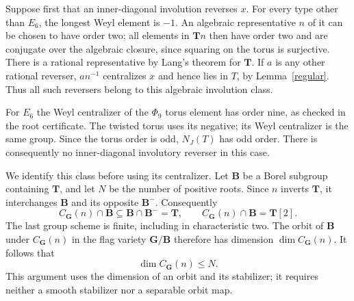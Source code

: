 \documentclass[10pt,a4paper]{article}
\begin{document}
Suppose first that an inner-diagonal involution reverses $x$.
For every type other than $E_6$, the longest Weyl element is $-1$.
An algebraic representative $n$ of it can be chosen to have order two;
all elements in $\mathbf Tn$ then have order two and are conjugate
over the algebraic closure, since squaring on the torus is surjective.
There is a rational representative by Lang's theorem for $\mathbf T$.
If $a$ is any other rational reverser, $an^{-1}$ centralizes $x$ and hence
lies in $T$, by Lemma~\ref{regular}. Thus all such reversers belong to
this algebraic involution class.

For $E_6$ the Weyl centralizer of the $\Phi_9$ torus element has order
nine, as checked in the root certificate. The twisted torus uses its
negative; its Weyl centralizer is the same group. Since the torus order
is odd, $N_J(T)$ has odd order. There is consequently no inner-diagonal
involutory reverser in this case.

We identify this class before using its centralizer. Let $\mathbf B$
be a Borel subgroup containing $\mathbf T$, and let $N$ be the number
of positive roots. Since $n$ inverts $\mathbf T$, it interchanges
$\mathbf B$ and its opposite $\mathbf B^-$. Consequently
\[
 C_{\mathbf G}(n)\cap\mathbf B
 \subseteq\mathbf B\cap\mathbf B^-=\mathbf T,
 \qquad C_{\mathbf G}(n)\cap\mathbf B=\mathbf T[2].
\]
The last group scheme is finite, including in characteristic two.
The orbit of $\mathbf B$ under $C_{\mathbf G}(n)$ in the flag variety
$\mathbf G/\mathbf B$ therefore has dimension $\dim C_{\mathbf G}(n)$.
It follows that
\begin{equation}\label{flagdimension}
                  \dim C_{\mathbf G}(n)\le N.
\end{equation}
This argument uses the dimension of an orbit and its stabilizer;
it requires neither a smooth stabilizer nor a separable orbit map.
\end{document}

